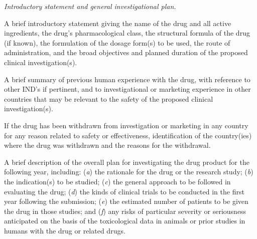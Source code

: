 \begin{description}[leftmargin=0.5cm,style=sameline]
\item[(3)] \textit{Introductory statement and general investigational plan.}
\begin{description}[leftmargin=0.8cm,style=sameline]
\item[(i)] A brief introductory statement giving the name of the drug and all active ingredients, the drug's pharmacological class, the structural formula of the drug (if known), the formulation of the dosage form(s) to be used, the route of administration, and the broad objectives and planned duration of the proposed clinical investigation(s).
\item[(ii)] A brief summary of previous human experience with the drug, with reference to other IND's if pertinent, and to investigational or marketing experience in other countries that may be relevant to the safety of the proposed clinical investigation(s).
\item[(iii)] If the drug has been withdrawn from investigation or marketing in any country for any reason related to safety or effectiveness, identification of the country(ies) where the drug was withdrawn and the reasons for the withdrawal.
\item[(iv)] A brief description of the overall plan for investigating the drug product for the following year, including: (\textit{a}) the rationale for the drug or the research study; (\textit{b}) the indication(s) to be studied; (\textit{c}) the general approach to be followed in evaluating the drug; (\textit{d}) the kinds of clinical trials to be conducted in the first year following the submission; (\textit{e}) the estimated number of patients to be given the drug in those studies; and (\textit{f}) any risks of particular severity or seriousness anticipated on the basis of the toxicological data in animals or prior studies in humans with the drug or related drugs.
\end{description}

\item[(4)] [Reserved]


\end{description}
